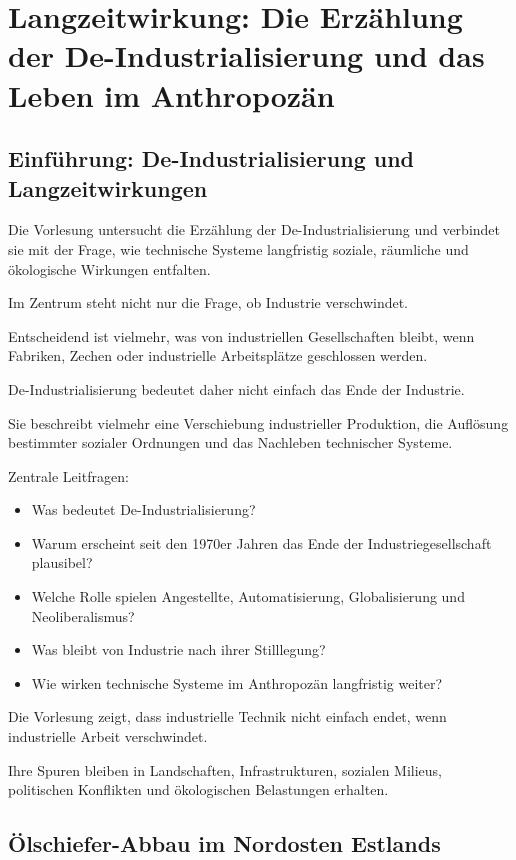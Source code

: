 \section{Langzeitwirkung: Die Erzählung der De-Industrialisierung und das Leben im Anthropozän}

\subsection{Einführung: De-Industrialisierung und Langzeitwirkungen}

Die Vorlesung untersucht die Erzählung
der De-Industrialisierung
und verbindet sie mit der Frage,
wie technische Systeme langfristig
soziale,
räumliche
und ökologische Wirkungen entfalten.

Im Zentrum steht nicht nur die Frage,
ob Industrie verschwindet.

Entscheidend ist vielmehr,
was von industriellen Gesellschaften bleibt,
wenn Fabriken,
Zechen
oder industrielle Arbeitsplätze geschlossen werden.

De-Industrialisierung bedeutet daher nicht einfach
das Ende der Industrie.

Sie beschreibt vielmehr eine Verschiebung
industrieller Produktion,
die Auflösung bestimmter sozialer Ordnungen
und das Nachleben technischer Systeme.

Zentrale Leitfragen:

\begin{itemize}
\item Was bedeutet De-Industrialisierung?
\item Warum erscheint seit den 1970er Jahren das Ende der Industriegesellschaft plausibel?
\item Welche Rolle spielen Angestellte, Automatisierung, Globalisierung und Neoliberalismus?
\item Was bleibt von Industrie nach ihrer Stilllegung?
\item Wie wirken technische Systeme im Anthropozän langfristig weiter?
\end{itemize}

Die Vorlesung zeigt,
dass industrielle Technik nicht einfach endet,
wenn industrielle Arbeit verschwindet.

Ihre Spuren bleiben in Landschaften,
Infrastrukturen,
sozialen Milieus,
politischen Konflikten
und ökologischen Belastungen erhalten.

\subsection{Ölschiefer-Abbau im Nordosten Estlands}

